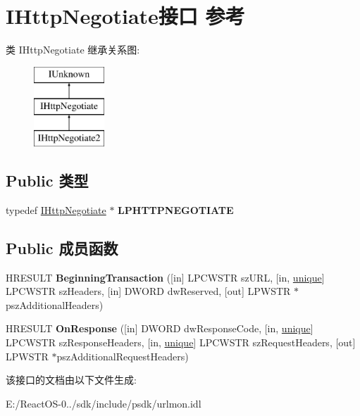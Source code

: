 \hypertarget{interface_i_http_negotiate}{}\section{I\+Http\+Negotiate接口 参考}
\label{interface_i_http_negotiate}
类 I\+Http\+Negotiate 继承关系图\+:\begin{figure}[H]
\begin{center}
\leavevmode
\includegraphics[height=3.000000cm]{interface_i_http_negotiate}
\end{center}
\end{figure}
\subsection*{Public 类型}
\begin{DoxyCompactItemize}
\item 
\mbox{\label{interface_i_http_negotiate_abd25330e34e54490607dd4f3bcbe9c26}} 
typedef \hyperlink{interface_i_http_negotiate}{I\+Http\+Negotiate} $\ast$ {\bfseries L\+P\+H\+T\+T\+P\+N\+E\+G\+O\+T\+I\+A\+TE}
\end{DoxyCompactItemize}
\subsection*{Public 成员函数}
\begin{DoxyCompactItemize}
\item 
\mbox{\label{interface_i_http_negotiate_abdd0a233337efedc176c9c9fa1f44a32}} 
H\+R\+E\+S\+U\+LT {\bfseries Beginning\+Transaction} (\mbox{[}in\mbox{]} L\+P\+C\+W\+S\+TR sz\+U\+RL, \mbox{[}in, \hyperlink{interfaceunique}{unique}\mbox{]} L\+P\+C\+W\+S\+TR sz\+Headers, \mbox{[}in\mbox{]} D\+W\+O\+RD dw\+Reserved, \mbox{[}out\mbox{]} L\+P\+W\+S\+TR $\ast$psz\+Additional\+Headers)
\item 
\mbox{\label{interface_i_http_negotiate_a435e99f2afaa5408482f1524a368ce63}} 
H\+R\+E\+S\+U\+LT {\bfseries On\+Response} (\mbox{[}in\mbox{]} D\+W\+O\+RD dw\+Response\+Code, \mbox{[}in, \hyperlink{interfaceunique}{unique}\mbox{]} L\+P\+C\+W\+S\+TR sz\+Response\+Headers, \mbox{[}in, \hyperlink{interfaceunique}{unique}\mbox{]} L\+P\+C\+W\+S\+TR sz\+Request\+Headers, \mbox{[}out\mbox{]} L\+P\+W\+S\+TR $\ast$psz\+Additional\+Request\+Headers)
\end{DoxyCompactItemize}


该接口的文档由以下文件生成\+:\begin{DoxyCompactItemize}
\item 
E\+:/\+React\+O\+S-\/0../sdk/include/psdk/urlmon.\+idl\end{DoxyCompactItemize}
